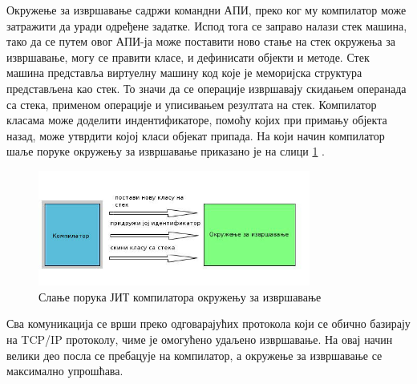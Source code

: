 \documentclass[12pt,oneside]{memoir}
\begin{document}
Окружење за извршавање садржи командни АПИ, преко ког му компилатор може затражити да уради одређене задатке. Испод тога се заправо налази стек машина, тако да се путем овог АПИ-ја може поставити ново стање на стек окружења за извршавање, могу се правити класе, и дефинисати објекти и методе. Стек машина представља виртуелну машину код које је меморијска структура представљена као стек. То значи да се операције извршавају скидањем операнада са стека, применом операције и уписивањем резултата на стек. Компилатор класама може доделити индентификаторе, помоћу којих при примању објекта назад, може утврдити којој класи објекат припада. На који начин компилатор шаље поруке окружењу за извршавање приказано је на слици \ref{fig:komunikacija} \cite{Dartino}.

\begin{figure}[!ht]
  \centering
  \includegraphics[width=0.8\textwidth]{compiler.jpg}
  \caption{Слање порука ЈИТ компилатора окружењу за извршавање}
  \label{fig:komunikacija}
\end{figure}

Сва комуникација се врши преко одговарајућих протокола који се обично базирају на TCP/IP протоколу, чиме је омогућено удаљено извршавање. На овај начин велики део посла се пребацује на компилатор, а окружење за извршавање се максимално упрошћава.
\end{document}
